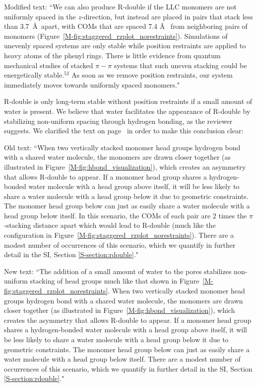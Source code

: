 \documentclass{article}
\begin{document}
\begin{enumerate}
    Modified text: ``We can also produce R-double if the LLC monomers are not
    uniformly spaced in the $z$-direction, but instead are placed in pairs that
    stack less than 3.7~\AA~apart, with COMs that are spaced 7.4 \AA~ from
    neighboring pairs of monomers (Figure~\ref{M-fig:staggered_rzplot_norestraints}).
    Simulations of unevenly spaced systems are only stable while position
    restraints are applied to heavy atoms of the phenyl rings. There is little
    evidence from quantum mechanical studies of stacked $\pi-\pi$ systems that such
    uneven stacking could be energetically stable.$^{52}$ As soon %
    as we remove position restraints, our system immediately moves towards uniformly spaced
    monomers."

    R-double is only long-term stable without position restraints if a small
    amount of water is present. We believe that water facilitates the appearance
    of R-double by stabilizing non-uniform spacing through hydrogen bonding, as the
    reviewer suggests. We clarified the text on page~\pageref{M-modification:rdouble2}
    in order to make this conclusion clear:

    Old text: ``When two vertically stacked monomer head groups hydrogen bond
    with a shared water molecule, the monomers are drawn closer together (as
    illustrated in Figure~\ref{M-fig:hbond_visualization}), which creates an
    asymmetry that allows R-double to appear. If a monomer head group shares a
    hydrogen-bonded water molecule with a head group above itself, it will be less
    likely to share a water molecule with a head group below it due to geometric
    constraints. The monomer head group below can just as easily share a water
    molecule with a head group below itself. In this scenario, the COMs of each
    pair are 2 times the $\pi$-stacking distance apart which would lead to R-double
    (much like the configuration in
     Figure~\ref{M-fig:staggered_rzplot_norestraints}). There are a modest number of
    occurrences of this scenario, which we quantify in further detail in the SI,
    Section \ref{S-section:rdouble}."

    New text: ``The addition of a small amount of water to the pores stabilizes
    non-uniform stacking of head groups much like that shown in
    Figure~\ref{M-fig:staggered_rzplot_norestraints}. When two vertically stacked
    monomer head groups hydrogen bond with a shared water molecule, the monomers
    are drawn closer together (as illustrated in
    Figure~\ref{M-fig:hbond_visualization}), which creates the asymmetry that allows
    R-double to appear. If a monomer head group shares a hydrogen-bonded water
    molecule with a head group above itself, it will be less likely to share a
    water molecule with a head group below it due to geometric constraints. The
    monomer head group below can just as easily share a water molecule with a head
    group below itself. There are a modest number of occurrences of this scenario,
    which we quantify in further detail in the SI, Section
    \ref{S-section:rdouble}."


\end{enumerate}
\end{document}
